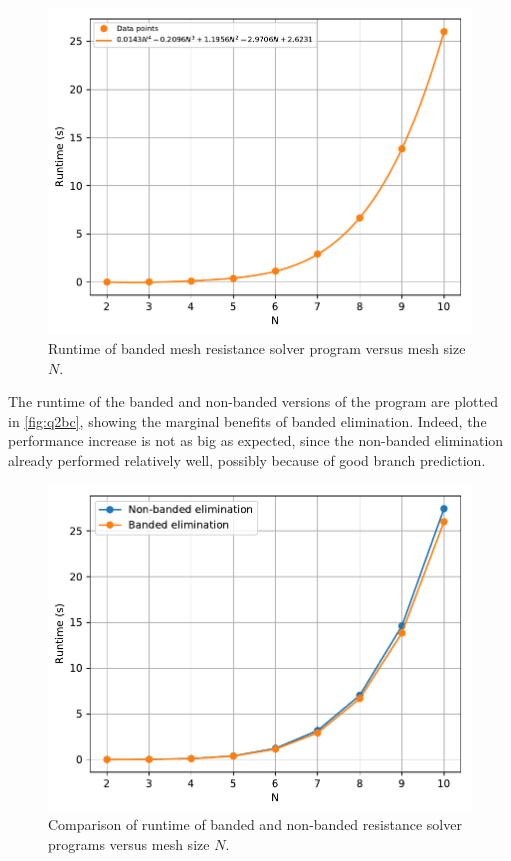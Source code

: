 \documentclass[a4paper,titlepage]{article}
\begin{document}
	\begin{figure}[!htb]
		\centering
		\includegraphics[width=\columnwidth]{plots/q2c.pdf}
		\caption
		{Runtime of banded mesh resistance solver program versus mesh size $N$.}
		\label{fig:q2c}
	\end{figure}

	The runtime of the banded and non-banded versions of the program are plotted in \autoref{fig:q2bc}, showing the marginal benefits of banded elimination. Indeed, the performance increase is not as big as expected, since the non-banded elimination already performed relatively well, possibly because of good branch prediction.

	\begin{figure}[!htb]
		\centering
		\includegraphics[width=\columnwidth]{plots/q2bc.pdf}
		\caption
		{Comparison of runtime of banded and non-banded resistance solver programs versus mesh size $N$.}
		\label{fig:q2bc}
	\end{figure}
	
\end{document}
